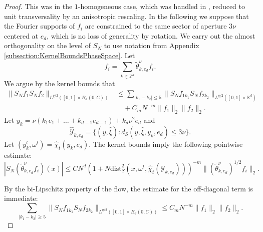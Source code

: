 \documentclass{amsart}
\numberwithin{equation}{section}
\theoremstyle{definition}
\newcommand{\R}{\mathbb{R}}
\newcommand{\Z}{\mathbb{Z}}
\begin{document}
\begin{proof}
This was in the $1$-homogeneous case, which was handled in \cite{SchippaTataru2025}, reduced to unit transversality by an anisotropic rescaling. In the following we suppose that the Fourier supports of $f_i$ are constrained to the same sector of aperture $3 \nu$ centered at $e_d$, which is no loss of generality by rotation. We carry out the almost orthogonality on the level of $S_N$ to use notation from Appendix \ref{subsection:KernelBoundsPhaseSpace}. Let
\begin{equation*}
    f_i = \sum_{k \in \Z^d} \tilde{\theta}^{\nu}_{k,e_d} f_i.
\end{equation*}
We argue by the kernel bounds that
\begin{equation*}
\begin{split}
    \| S_N f_1 S_N f_2 \|_{L^{q/2}([0,1] \times B_d(0,C))} &\leq \sum_{|k_1-k_2| \leq 5} \| S_N f_{1 k_1} S_N f_{2 k_2} \|_{L^{q/2}([0,1]\times \R^d)} \\
    &\quad + C_m N^{-m} \| f_1 \|_2 \| f_2 \|_2.
\end{split}
\end{equation*}
Let $y_k = \nu(k_1 e_1 + \ldots + k_{d-1} e_{d-1}) + k_d \nu^2 e_d$ and
\begin{equation*}
    \hat{\mathcal{Y}}_{k,e_d} = \{ (y,\hat{\xi}) : d_S(y,\hat{\xi},y_k,e_d) \leq 3 \nu \}.
\end{equation*}
Let $(y_k^t,\omega^t) = \hat{\chi}_t (y_k,e_d)$. The kernel bounds imply the following pointwise estimate:
\begin{equation*}
    |S_N (\tilde{\theta}^{\nu}_{k,e_d} f_i)(x)| \leq C N^d (1+ N \text{dist}_S^2(x,\omega^t,\hat{\chi}_t(\hat{\mathcal{Y}}_{k,e_d})))^{-m} \| ( \tilde{\theta}_{k,e_d}^{\nu})^{1/2} f_i \|_2.
\end{equation*}

By the bi-Lipschitz property of the flow, the estimate for the off-diagonal term is immediate:
\begin{equation*}
   \sum_{|k_1-k_2| \geq 5} \| S_N f_{1 k_1} S_N f_{2 k_2} \|_{L^{q/2}([0,1]\times B_d(0,C))} \leq C_m N^{-m} \| f_{1} \|_2 \| f_2 \|_2.
\end{equation*}


\end{proof}
\end{document}
